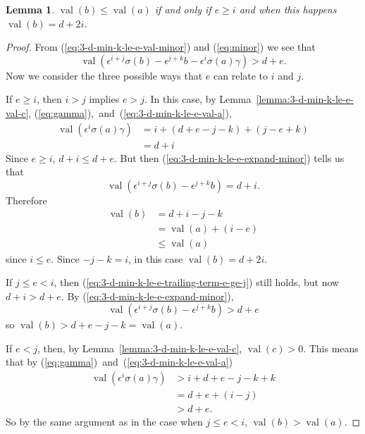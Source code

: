 \documentclass{amsart}
\newtheorem{lemma}{Lemma}[subsection]
\theoremstyle{definition}
\def\e{\epsilon}
\def\val{\mathop{\mathrm{val}}}
\def\s{\sigma}
\begin{document}
  \begin{lemma}
    \label{lemma:3-d-min-k-le-e-val-b}
    $\val(b) \le \val(a)$ if and only if $e \ge i$ and when this happens
    $\val(b) = d + 2i$.
  \end{lemma}
  \begin{proof}
    From (\ref{eq:3-d-min-k-le-e-val-minor}) and (\ref{eq:minor}) we see that
    \begin{equation}
      \label{eq:3-d-min-k-le-e-expand-minor}
      \val(\e^{i+j}\s(b) - \e^{j+k}b - \e^i\s(a)\gamma) > d + e.
    \end{equation}
    Now we consider the three possible ways that $e$ can relate to $i$ and $j$.

    If $e \ge i$, then $i > j$ implies $e > j$.  In this case, by
    Lemma~\ref{lemma:3-d-min-k-le-e-val-c},
    (\ref{eq:gamma}),~and~(\ref{eq:3-d-min-k-le-e-val-a}),
    \begin{align}
      \label{eq:3-d-min-k-le-e-trailing-term-e-ge-j}
      \val(\e^i\s(a)\gamma) &= i + (d + e - j - k) + (j - e + k) \nonumber \\
                            &= d + i
    \end{align}
    Since $e \ge i$, $d + i \le d + e$.  But then
    (\ref{eq:3-d-min-k-le-e-expand-minor}) tells us that
    \begin{equation*}
      \val(\e^{i+j}\s(b) - \e^{j+k}b) = d + i.
    \end{equation*}
    Therefore
    \begin{align*}
      \val(b) &= d + i - j - k \\
              &= \val(a) + (i - e) \\
              &\le \val(a)
    \end{align*}
    since $i \le e$.  Since $-j -k = i$, in this case $\val(b) = d + 2i$.

    If $j \le e < i$, then (\ref{eq:3-d-min-k-le-e-trailing-term-e-ge-j}) still
    holds, but now $d + i > d + e$.  By (\ref{eq:3-d-min-k-le-e-expand-minor}),
    \begin{equation*}
      \val(\e^{i+j}\s(b) - \e^{j+k}b) > d + e
    \end{equation*}
    so $\val(b) > d + e - j - k = \val(a)$.

    If $e < j$, then, by Lemma~\ref{lemma:3-d-min-k-le-e-val-c}, $\val(c) > 0$.
    This means that by (\ref{eq:gamma})~and~(\ref{eq:3-d-min-k-le-e-val-a})
    \begin{align*}
      \val(\e^i\s(a)\gamma) &> i + d + e - j - k + k \\
                            &= d + e + (i - j) \\
                            &> d + e.
    \end{align*}
    So by the same argument as in the case when $j \le e < i$, $\val(b) >
    \val(a)$.
  \end{proof}
\end{document}
